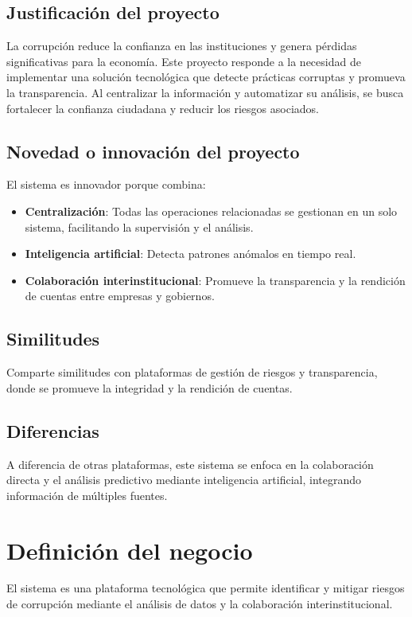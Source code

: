\documentclass[a4paper,12pt]{article}
\begin{document}
\subsection{Justificación del proyecto}
La corrupción reduce la confianza en las instituciones y genera pérdidas significativas para la economía. Este proyecto responde a la necesidad de implementar una solución tecnológica que detecte prácticas corruptas y promueva la transparencia. Al centralizar la información y automatizar su análisis, se busca fortalecer la confianza ciudadana y reducir los riesgos asociados.

\subsection{Novedad o innovación del proyecto}
El sistema es innovador porque combina:
\begin{itemize}
    \item \textbf{Centralización}: Todas las operaciones relacionadas se gestionan en un solo sistema, facilitando la supervisión y el análisis.
    \item \textbf{Inteligencia artificial}: Detecta patrones anómalos en tiempo real.
    \item \textbf{Colaboración interinstitucional}: Promueve la transparencia y la rendición de cuentas entre empresas y gobiernos.
\end{itemize}

\subsection{Similitudes}
Comparte similitudes con plataformas de gestión de riesgos y transparencia, donde se promueve la integridad y la rendición de cuentas.

\subsection{Diferencias}
A diferencia de otras plataformas, este sistema se enfoca en la colaboración directa y el análisis predictivo mediante inteligencia artificial, integrando información de múltiples fuentes.

\section{Definición del negocio}
El sistema es una plataforma tecnológica que permite identificar y mitigar riesgos de corrupción mediante el análisis de datos y la colaboración interinstitucional.
\end{document}
